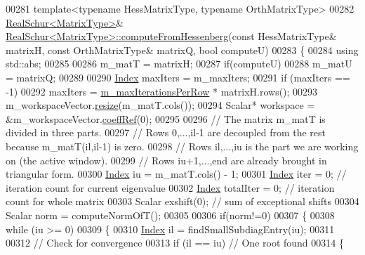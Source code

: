 \begin{DoxyCode}
00281 \textcolor{keyword}{template}<\textcolor{keyword}{typename} HessMatrixType, \textcolor{keyword}{typename} OrthMatrixType>
00282 \hyperlink{group___eigenvalues___module}{RealSchur<MatrixType>}& 
      \hyperlink{group___eigenvalues___module_ac4acc917dcaddefae5f35acd2c536d65}{RealSchur<MatrixType>::computeFromHessenberg}(\textcolor{keyword}{const} 
      HessMatrixType& matrixH, \textcolor{keyword}{const} OrthMatrixType& matrixQ,  \textcolor{keywordtype}{bool} computeU)
00283 \{
00284   \textcolor{keyword}{using} std::abs;
00285 
00286   m\_matT = matrixH;
00287   \textcolor{keywordflow}{if}(computeU)
00288     m\_matU = matrixQ;
00289   
00290   \hyperlink{group___eigenvalues___module_a8bd4653e2d9569a44ecc95e746422d3f}{Index} maxIters = m\_maxIters;
00291   \textcolor{keywordflow}{if} (maxIters == -1)
00292     maxIters = \hyperlink{group___eigenvalues___module_ab42163ff22cd3ad98aa2bde39b4bbc79}{m\_maxIterationsPerRow} * matrixH.rows();
00293   m\_workspaceVector.\hyperlink{class_eigen_1_1_plain_object_base_a99d9054ee2d5a40c6e00ded0265e9cea}{resize}(m\_matT.cols());
00294   Scalar* workspace = &m\_workspaceVector.\hyperlink{class_eigen_1_1_plain_object_base_a25626a55b26a4323565f79d1b7c48ea8}{coeffRef}(0);
00295 
00296   \textcolor{comment}{// The matrix m\_matT is divided in three parts. }
00297   \textcolor{comment}{// Rows 0,...,il-1 are decoupled from the rest because m\_matT(il,il-1) is zero. }
00298   \textcolor{comment}{// Rows il,...,iu is the part we are working on (the active window).}
00299   \textcolor{comment}{// Rows iu+1,...,end are already brought in triangular form.}
00300   \hyperlink{group___eigenvalues___module_a8bd4653e2d9569a44ecc95e746422d3f}{Index} iu = m\_matT.cols() - 1;
00301   \hyperlink{group___eigenvalues___module_a8bd4653e2d9569a44ecc95e746422d3f}{Index} iter = 0;      \textcolor{comment}{// iteration count for current eigenvalue}
00302   \hyperlink{group___eigenvalues___module_a8bd4653e2d9569a44ecc95e746422d3f}{Index} totalIter = 0; \textcolor{comment}{// iteration count for whole matrix}
00303   Scalar exshift(0);   \textcolor{comment}{// sum of exceptional shifts}
00304   Scalar norm = computeNormOfT();
00305 
00306   \textcolor{keywordflow}{if}(norm!=0)
00307   \{
00308     \textcolor{keywordflow}{while} (iu >= 0)
00309     \{
00310       \hyperlink{group___eigenvalues___module_a8bd4653e2d9569a44ecc95e746422d3f}{Index} il = findSmallSubdiagEntry(iu);
00311 
00312       \textcolor{comment}{// Check for convergence}
00313       \textcolor{keywordflow}{if} (il == iu) \textcolor{comment}{// One root found}
00314       \{

\end{DoxyCode}
